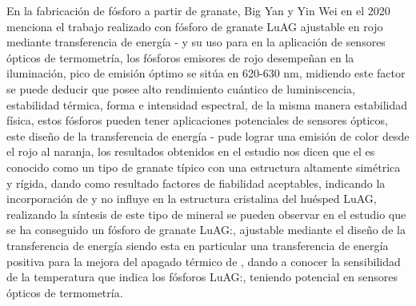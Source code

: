 En la fabricación de fósforo  a partir de granate, Big Yan y
Yin Wei en el 2020  menciona  el trabajo realizado con fósforo de granate LuAG
ajustable en rojo mediante transferencia de energía  -
 y su uso para  en la aplicación de sensores ópticos de
termometría, los fósforos emisores de rojo desempeñan en la iluminación, pico
de emisión óptimo se sitúa en 620-630 nm, midiendo este factor se puede deducir
que posee alto rendimiento cuántico de luminiscencia, estabilidad térmica,
forma e intensidad espectral, de la misma manera estabilidad física, estos
fósforos  pueden tener aplicaciones  potenciales de sensores ópticos, este
diseño de  la transferencia  de energía - pude lograr
una emisión  de color desde el rojo al naranja, los resultados obtenidos en el
estudio nos dicen que el  es conocido como un tipo de granate
típico con una estructura altamente simétrica y rígida, dando como resultado
factores de fiabilidad aceptables, indicando la incorporación de  y
 no influye en la estructura cristalina del huésped LuAG,
realizando la síntesis de este tipo de mineral se pueden observar en el estudio
que  se ha conseguido un fósforo  de granate LuAG:, 
ajustable mediante el diseño de la transferencia de energía 
 siendo esta en particular  una transferencia de energía positiva
para la mejora del apagado térmico de ,   dando a conocer la
sensibilidad de la temperatura que indica los fósforos LuAG:,
 teniendo potencial en sensores ópticos  de
termometría\cite{Yan2021}.\\

